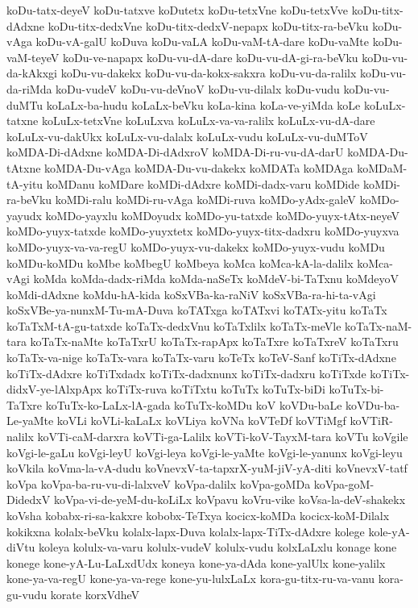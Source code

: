 {koDu-tatx-deyeV
koDu-tatxve
koDutetx
koDu-tetxVne
koDu-tetxVve
koDu-titx-dAdxne
koDu-titx-dedxVne
koDu-titx-dedxV-nepapx
koDu-titx-ra-beVku
koDu-vAga
koDu-vA-galU
koDuva
koDu-vaLA
koDu-vaM-tA-dare
koDu-vaMte
koDu-vaM-teyeV
koDu-ve-napapx
koDu-vu-dA-dare
koDu-vu-dA-gi-ra-beVku
koDu-vu-da-kAkxgi
koDu-vu-dakekx
koDu-vu-da-kokx-sakxra
koDu-vu-da-ralilx
koDu-vu-da-riMda
koDu-vudeV
koDu-vu-deVnoV
koDu-vu-dilalx
koDu-vudu
koDu-vu-duMTu
koLaLx-ba-hudu
koLaLx-beVku
koLa-kina
koLa-ve-yiMda
koLe
koLuLx-tatxne
koLuLx-tetxVne
koLuLxva
koLuLx-va-va-ralilx
koLuLx-vu-dA-dare
koLuLx-vu-dakUkx
koLuLx-vu-dalalx
koLuLx-vudu
koLuLx-vu-duMToV
koMDA-Di-dAdxne
koMDA-Di-dAdxroV
koMDA-Di-ru-vu-dA-darU
koMDA-Du-tAtxne
koMDA-Du-vAga
koMDA-Du-vu-dakekx
koMDATa
koMDAga
koMDaM-tA-yitu
koMDanu
koMDare
koMDi-dAdxre
koMDi-dadx-varu
koMDide
koMDi-ra-beVku
koMDi-ralu
koMDi-ru-vAga
koMDi-ruva
koMDo-yAdx-galeV
koMDo-yayudx
koMDo-yayxlu
koMDoyudx
koMDo-yu-tatxde
koMDo-yuyx-tAtx-neyeV
koMDo-yuyx-tatxde
koMDo-yuyxtetx
koMDo-yuyx-titx-dadxru
koMDo-yuyxva
koMDo-yuyx-va-va-regU
koMDo-yuyx-vu-dakekx
koMDo-yuyx-vudu
koMDu
koMDu-koMDu
koMbe
koMbegU
koMbeya
koMca
koMca-kA-la-dalilx
koMca-vAgi
koMda
koMda-dadx-riMda
koMda-naSeTx
koMdeV-bi-TaTxnu
koMdeyoV
koMdi-dAdxne
koMdu-hA-kida
koSxVBa-ka-raNiV
koSxVBa-ra-hi-ta-vAgi
koSxVBe-ya-nunxM-Tu-mA-Duva
koTATxga
koTATxvi
koTATx-yitu
koTaTx
koTaTxM-tA-gu-tatxde
koTaTx-dedxVnu
koTaTxlilx
koTaTx-meVle
koTaTx-naM-tara
koTaTx-naMte
koTaTxrU
koTaTx-rapApx
koTaTxre
koTaTxreV
koTaTxru
koTaTx-va-nige
koTaTx-vara
koTaTx-varu
koTeTx
koTeV-Sanf
koTiTx-dAdxne
koTiTx-dAdxre
koTiTxdadx
koTiTx-dadxnunx
koTiTx-dadxru
koTiTxde
koTiTx-didxV-ye-lAlxpApx
koTiTx-ruva
koTiTxtu
koTuTx
koTuTx-biDi
koTuTx-bi-TaTxre
koTuTx-ko-LaLx-lA-gada
koTuTx-koMDu
koV
koVDu-baLe
koVDu-ba-Le-yaMte
koVLi
koVLi-kaLaLx
koVLiya
koVNa
koVTeDf
koVTiMgf
koVTiR-nalilx
koVTi-caM-darxra
koVTi-ga-Lalilx
koVTi-koV-TayxM-tara
koVTu
koVgile
koVgi-le-gaLu
koVgi-leyU
koVgi-leya
koVgi-le-yaMte
koVgi-le-yanunx
koVgi-leyu
koVkila
koVma-la-vA-dudu
koVnevxV-ta-tapxrX-yuM-jiV-yA-diti
koVnevxV-tatf
koVpa
koVpa-ba-ru-vu-di-lalxveV
koVpa-dalilx
koVpa-goMDa
koVpa-goM-DidedxV
koVpa-vi-de-yeM-du-koLiLx
koVpavu
koVru-vike
koVsa-la-deV-shakekx
koVsha
kobabx-ri-sa-kakxre
kobobx-TeTxya
kocicx-koMDa
kocicx-koM-Dilalx
kokikxna
kolalx-beVku
kolalx-lapx-Duva
kolalx-lapx-TiTx-dAdxre
kolege
kole-yA-diVtu
koleya
kolulx-va-varu
kolulx-vudeV
kolulx-vudu
kolxLaLxlu
konage
kone
konege
kone-yA-Lu-LaLxdUdx
koneya
kone-ya-dAda
kone-yalUlx
kone-yalilx
kone-ya-va-regU
kone-ya-va-rege
kone-yu-lulxLaLx
kora-gu-titx-ru-va-vanu
kora-gu-vudu
korate
korxVdheV
}
